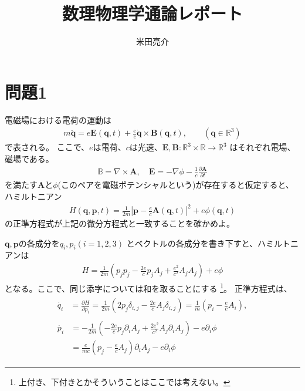 \documentclass{jsarticle}
\begin{document}
\title{数理物理学通論レポート}
\author{米田亮介}
\date{}
\maketitle
\section*{問題1}
\begin{shaded}
電磁場における電荷の運動は
\begin{align}
m\ddot{\pmb{q}}=e\pmb{E}(\pmb{q},t)+\frac{e}{c}\dot{\pmb{q}}\times\pmb{B}(\pmb{q},t),\qquad(\pmb{q}\in \mathbb{R}^{3})
\end{align}
で表される。
ここで、$e$は電荷、$c$は光速、$\pmb{E},\pmb{B}:\mathbb{R}^{3}\times\mathbb{R}\to\mathbb{R}^{3}$
はそれぞれ電場、磁場である。
\begin{align}
\mathbb{B}=\nabla\times\pmb{A},\quad
\pmb{E}=-\nabla\phi-\frac{1}{c}\frac{\partial\pmb{A}}{\partial t}
\end{align}
を満たす$\pmb{A}$と$\phi$(このペアを電磁ポテンシャルという)が存在すると仮定すると、ハミルトニアン
\begin{align}
H(\pmb{q},\pmb{p},t)=\frac{1}{2m}\left|\pmb{p}-\frac{e}{c}\pmb{A}(\pmb{q},t)\right|^{2}+e\phi(\pmb{q},t)
\end{align}
の正準方程式が上記の微分方程式と一致することを確かめよ。
\end{shaded}
$\pmb{q},\pmb{p}$の各成分を$q_{i},p_{i}(i=1,2,3)$
とベクトルの各成分を書き下すと、ハミルトニアンは
\begin{align}
H=\frac{1}{2m}\left(p_{j}p_{j}-\frac{2e}{c}p_{j}A_{j}+\frac{e^{2}}{c^{2}}A_{j}A_{j}\right)+e\phi
\end{align}
となる。ここで、同じ添字については和を取ることにする
\footnote{上付き、下付きとかそういうことはここでは考えない。}。
正準方程式は、
\begin{align}
\begin{split}
\dot{q_{i}}&=\frac{\partial H}{\partial p_{i}}
=\frac{1}{2m}\left(2p_{j}\delta_{i,j}-\frac{2e}{c}A_{j}\delta_{i,j}\right)
=\frac{1}{m}\left(p_{i}-\frac{e}{c}A_{i}\right),
\end{split}\\
\begin{split}
\dot{p_{i}}&=-\frac{1}{2m}\left(-\frac{2e}{c}p_{j}\partial_{i}A_{j}
+\frac{2e^{2}}{c^{2}}A_{j}\partial_{i}A_{j}\right)
-e\partial_{i}\phi\\
&=\frac{e}{mc}\left(p_{j}
-\frac{e}{c}A_{j}\right)\partial_{i}A_{j}-e\partial_{i}\phi
\end{split}
\end{align}
\end{document}
